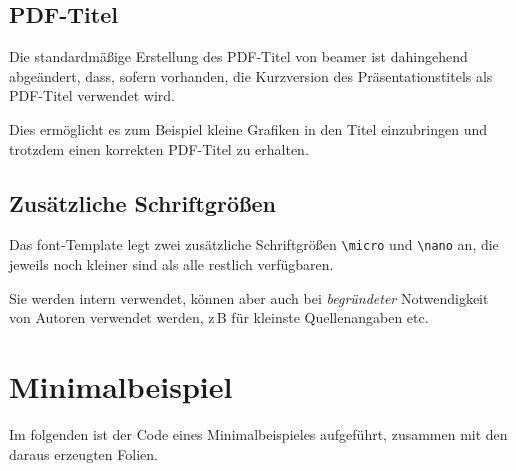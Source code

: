 \documentclass[cmyk,a4paper,colorscheme=green,TUBStitlepage=picture]{tubsreprt}
\begin{document}
\section{PDF-Titel}

Die standardmäßige Erstellung des PDF-Titel von beamer ist dahingehend
abgeändert, dass, sofern vorhanden, die Kurzversion des Präsentationstitels
als PDF-Titel verwendet wird.

Dies ermöglicht es zum Beispiel kleine Grafiken in den Titel einzubringen und
trotzdem einen korrekten PDF-Titel zu erhalten.


\section{Zusätzliche Schriftgrößen}

Das font-Template legt zwei zusätzliche Schriftgrößen \lstinline{\micro}
und \lstinline{\nano} an, die jeweils noch kleiner sind als alle restlich
verfügbaren.

Sie werden intern verwendet, können aber auch bei \emph{begründeter}
Notwendigkeit von Autoren verwendet werden, z\,B für kleinste Quellenangaben
etc.


\chapter{Minimalbeispiel}

Im folgenden ist der Code eines Minimalbeispieles aufgeführt, zusammen mit den
daraus erzeugten Folien.
\end{document}
